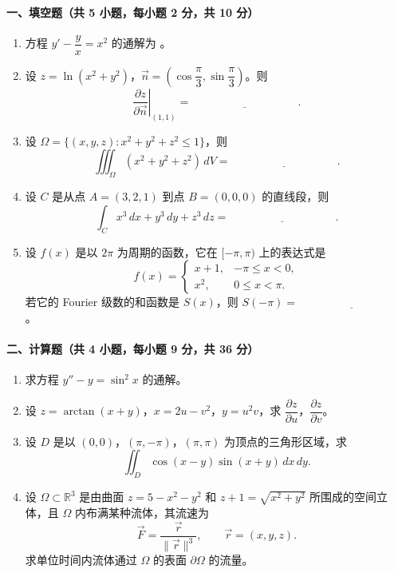 \paragraph*{一、填空题（共 5 小题，每小题 2 分，共 10 分）}
\begin{enumerate}
  \item 方程 $y'-\dfrac{y}{x}=x^2$ 的通解为 \underline{\hspace{4cm}}。
  \item 设 $z=\ln(x^2+y^2)$，$\vec n=\left(\cos\dfrac{\pi}{3},\sin\dfrac{\pi}{3}\right)$。则
  \[
    \left.\frac{\partial z}{\partial \vec n}\right|_{(1,1)}=\underline{\hspace{4cm}}.
  \]
  \item 设 $\Omega=\{(x,y,z):x^2+y^2+z^2\le 1\}$，则
  \[
    \iiint_\Omega (x^2+y^2+z^2)\,dV=\underline{\hspace{4cm}}.
  \]
  \item 设 $C$ 是从点 $A=(3,2,1)$ 到点 $B=(0,0,0)$ 的直线段，则
  \[
    \int_C x^3\,dx+y^3\,dy+z^3\,dz=\underline{\hspace{4cm}}.
  \]
  \item 设 $f(x)$ 是以 $2\pi$ 为周期的函数，它在 $[-\pi,\pi)$ 上的表达式是
  \[
    f(x)=
    \begin{cases}
      x+1, & -\pi\le x<0,\\
      x^2, & 0\le x<\pi.
    \end{cases}
  \]
  若它的 Fourier 级数的和函数是 $S(x)$，则 $S(-\pi)=\underline{\hspace{4cm}}$。
\end{enumerate}

\paragraph*{二、计算题（共 4 小题，每小题 9 分，共 36 分）}
\begin{enumerate}
  \item 求方程 $y''-y=\sin^2x$ 的通解。
  \item 设 $z=\arctan(x+y)$，$x=2u-v^2$，$y=u^2v$，求 $\dfrac{\partial z}{\partial u}$，$\dfrac{\partial z}{\partial v}$。
  \item 设 $D$ 是以 $(0,0)$，$(\pi,-\pi)$，$(\pi,\pi)$ 为顶点的三角形区域，求
  \[
    \iint_D \cos(x-y)\sin(x+y)\,dx\,dy.
  \]
  \item 设 $\Omega\subset\mathbb R^3$ 是由曲面 $z=5-x^2-y^2$ 和 $z+1=\sqrt{x^2+y^2}$ 所围成的空间立体，且 $\Omega$ 内布满某种流体，其流速为
  \[
    \vec F=\frac{\vec r}{\|\vec r\|^3},\qquad \vec r=(x,y,z).
  \]
  求单位时间内流体通过 $\Omega$ 的表面 $\partial\Omega$ 的流量。
\end{enumerate}

